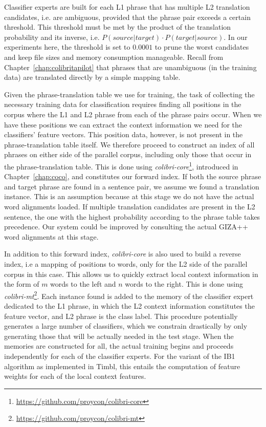 Classifier experts are built for each L1 phrase that has multiple L2
translation candidates, i.e. are ambiguous, provided that the phrase pair
exceeds a certain threshold. This threshold must be met by the product of the
translation probability and its inverse, i.e. $P(source|target) \cdot
P(target|source)$.  In our experiments here, the threshold is set to $0.0001$
to prune the worst candidates and keep file sizes and memory consumption
manageable. Recall from Chapter~\ref{chap:colibritapilot} that phrases that are
unambiguous (in the training data) are translated directly by a simple mapping
table.

Given the phrase-translation table we use for training, the task of collecting
the necessary training data for classification requires finding all positions
in the corpus where the L1 and L2 phrase from each of the phrase pairs occur.
When we have these positions we can extract the context information we need for
the classifiers' feature vectors.  This position data, however, is not present
in the phrase-translation table itself.  We therefore proceed to construct an
index of all phrases on either side of the parallel corpus, including only
those that occur in the phrase-translation table. This is done using
\emph{colibri-core}\footnote{\url{https://github.com/proycon/colibri-core}},
introduced in Chapter~\ref{chap:coco}, and constitutes our forward index.
If both the source phrase and target phrase are found in a sentence pair, we
assume we found a translation instance. This is an assumption because at this
stage we do not have the actual word alignments loaded. If multiple translation
candidates are present in the L2 sentence, the one with the highest probability
according to the phrase table takes precedence. Our system could be improved by
consulting the actual GIZA++ word alignments at this stage.

In addition to this forward index, \emph{colibri-core} is also used to build a reverse
index, i.e a mapping of positions to words, only for the L2 side of the parallel
corpus in this case. This allows us to quickly extract local context
information in the form of $m$ words to the left and $n$ words to the right.
This is done using \emph{colibri-mt}\footnote{\url{https://github.com/proycon/colibri-mt}}.
Each instance found is added to the memory of the classifier expert dedicated
to the L1 phrase, in which the L2 context information constitutes the feature
vector, and L2 phrase is the class label. This procedure potentially generates a large
number of classifiers, which we constrain drastically by only generating those
that will be actually needed in the test stage.
When the memories are constructed for all, the actual
training begins and proceeds independently for each of the classifier experts.
For the variant of the IB1 algorithm as implemented in Timbl, this entails the computation of
feature weights for each of the local context features.


